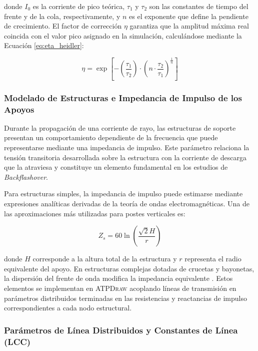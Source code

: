 \documentclass[12pt,letterpaper]{article}
\begin{document}
donde $I_0$ es la corriente de pico teórica, $\tau_1$ y $\tau_2$ son las constantes de tiempo del frente y de la cola, respectivamente, y $n$ es el exponente que define la pendiente de crecimiento. El factor de corrección $\eta$ garantiza que la amplitud máxima real coincida con el valor pico asignado en la simulación, calculándose mediante la Ecuación \eqref{eq:eta_heidler}:

\begin{equation}
\eta = \exp\left[ -\left( \frac{\tau_1}{\tau_2} \right) \cdot \left( n \cdot \frac{\tau_2}{\tau_1} \right)^{\frac{1}{n}} \right]
\label{eq:eta_heidler}
\end{equation}


\subsubsection{Modelado de Estructuras e Impedancia de Impulso de los Apoyos}

Durante la propagación de una corriente de rayo, las estructuras de soporte presentan un comportamiento dependiente de la frecuencia que puede representarse mediante una impedancia de impulso. Este parámetro relaciona la tensión transitoria desarrollada sobre la estructura con la corriente de descarga que la atraviesa y constituye un elemento fundamental en los estudios de \textit{Backflashover}.

Para estructuras simples, la impedancia de impulso puede estimarse mediante expresiones analíticas derivadas de la teoría de ondas electromagnéticas. Una de las aproximaciones más utilizadas para postes verticales es:

\begin{equation}
Z_s = 60 \ln \left(\frac{\sqrt{2}H}{r}\right)
\label{eq:poste_simple}
\end{equation}

donde $H$ corresponde a la altura total de la estructura y $r$ representa el radio equivalente del apoyo. En estructuras complejas dotadas de crucetas y bayonetas, la dispersión del frente de onda modifica la impedancia equivalente \cite{IEEE_1243}. Estos elementos se implementan en \textsc{ATPDraw} acoplando líneas de transmisión en parámetros distribuidos terminadas en las resistencias y reactancias de impulso correspondientes a cada nodo estructural.


\subsubsection{Parámetros de Línea Distribuidos y Constantes de Línea (LCC)}
\end{document}
